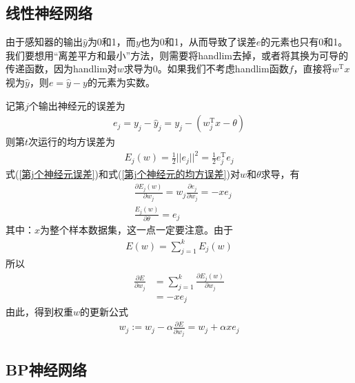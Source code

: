     \subsection{线性神经网络}
        \par
        由于感知器的输出$\hat{y}$为0和1，而$y$也为0和1，从而导致了误差$e$的元素也只有0和1。我们要想用“离差平方和最小”方法，则需要将handlim去掉，或者将其换为可导的传递函数，因为handlim对$w$求导为0。如果我们不考虑handlim函数$f$，直接将$w^\mathrm{T}x$视为$\hat{y}$，则$e = \hat{y} - y$的元素为实数。
        \par
        记第$j$个输出神经元的误差为
        \begin{align}
        \label{第j个神经元误差}
        e_j = y_j - \hat{y}_j = y_j - \left( w_j^\mathrm{T}x - \theta \right)
        \end{align}
        则第$t$次运行的均方误差为
        \begin{align}
        \label{第j个神经元的均方误差}
        E_j(w) = \frac{1}{2} ||e_j||^2 = \frac{1}{2}e_j^\mathrm{T}e_j
        \end{align}
        式(\ref{第j个神经元误差})和式(\ref{第j个神经元的均方误差})对$w$和$\theta$求导，有
        \begin{align*}
        & \frac{\partial E_j(w)}{\partial w_j} = w_j\frac{\partial e_j}{\partial w_j}= -x e_j\\
        & \frac{E_j(w)}{\partial \theta} = e_j
        \end{align*}
        其中：$x$为整个样本数据集，这一点一定要注意。由于
        \begin{align*}
        E(w) = \sum_{j=1}^k E_j(w)
        \end{align*}
        所以
        \begin{align*}
        \frac{\partial E}{\partial w_j} & = \sum_{j=1}^k \frac{\partial E_j(w)}{\partial w_j} \\
        & = -x e_j
        \end{align*}
        由此，得到权重$w$的更新公式
        \begin{align*}
        w_j:=w_j -\alpha \frac{\partial E}{\partial w_j} = w_j + \alpha x e_j
        \end{align*}

    \subsection{BP神经网络}
